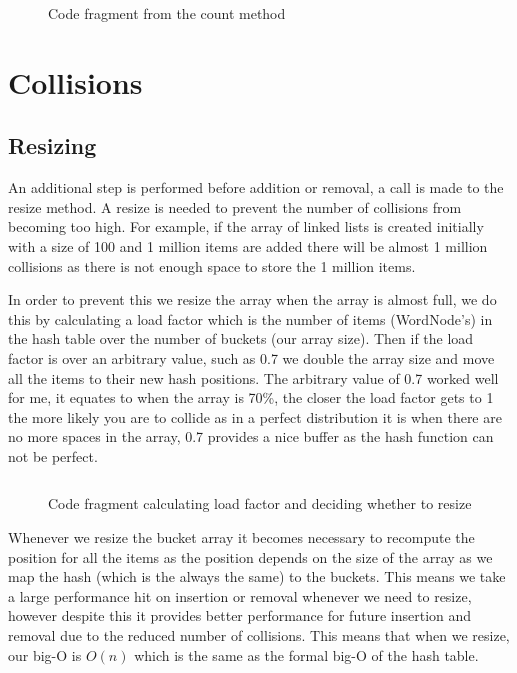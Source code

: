 \documentclass[12pt]{article}
\begin{document}
\begin{figure}[!htp]
\centering
{}
\caption{Code fragment from the count method}
\label{lst:count_method}
\end{figure}

\section{Collisions}
\subsection{Resizing}
An additional step is performed before addition or removal, a call is made to the resize method. A resize is needed to prevent the number of collisions from becoming too high. For example, if the array of linked lists is created initially with a size of 100 and 1 million items are added there will be almost 1 million collisions as there is not enough space to store the 1 million items.

In order to prevent this we resize the array when the array is almost full, we do this by calculating a load factor which is the number of items (WordNode's) in the hash table over the number of buckets (our array size). Then if the load factor is over an arbitrary value, such as 0.7 we double the array size and move all the items to their new hash positions. The arbitrary value of 0.7 worked well for me, it equates to when the array is 70\%, the closer the load factor gets to 1 the more likely you are to collide as in a perfect distribution it is when there are no more spaces in the array, 0.7 provides a nice buffer as the hash function can not be perfect.

\begin{figure}[!htp]
\centering
\inputminted[mathescape,breaklines=true,fontsize=\footnotesize,baselinestretch=0.8,firstline=39,lastline=45]{java}{../src/main/java/com/ryanwelch/wordstore/WordStoreHashTableImp.java}
\caption{Code fragment calculating load factor and deciding whether to resize}
\label{lst:load_factor_code}
\end{figure}

Whenever we resize the bucket array it becomes necessary to recompute the position for all the items as the position depends on the size of the array as we map the hash (which is the always the same) to the buckets. This means we take a large performance hit on insertion or removal whenever we need to resize, however despite this it provides better performance for future insertion and removal due to the reduced number of collisions. This means that when we resize, our big-O is $O(n)$ which is the same as the formal big-O of the hash table.
\end{document}
